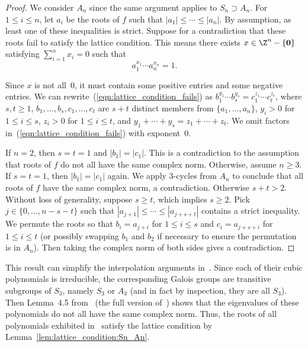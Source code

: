 \documentclass[11pt]{article}
\newenvironment{remark}{\medskip{\bfseries \noindent Remark:}}{\par\medskip}{\par\medskip}
\begin{document}
\begin{proof}
 We consider $A_n$ since the same argument applies to $S_n \supset A_n$.
 For $1 \le i \le n$,
 let $a_i$ be the roots of $f$ such that $|a_1| \le \dotsb \le |a_n|$.
 By assumption, as least one of these inequalities is strict.
 Suppose for a contradiction that these roots fail to satisfy the lattice condition.
 This means there exists $x \in \Z^n - \{\mathbf{0}\}$ satisfying $\sum_{i=1}^n x_i = 0$ such that
 \begin{equation} \label{eqn:lattice_condition_fails}
  a_1^{x_1} \dotsb a_n^{x_n} = 1.
 \end{equation}
 
 Since $x$ is not all~$0$,
 it must contain some positive entries and some negative entries.
 We can rewrite~(\ref{eqn:lattice_condition_fails}) as $b_1^{y_1} \dotsb b_s^{y_s} = c_1^{z_1} \dotsb c_t^{z_t}$,
 where $s, t \ge 1$, $b_1, \ldots, b_s, c_1, \ldots, c_t$ are $s+t$ distinct members from $\{a_1, \ldots, a_n\}$,
 $y_i > 0$ for $1 \le i \le s$, $z_i > 0$ for $1 \le i \le t$, and
 $y_1 + \dotsb + y_s = z_1 + \dotsb + z_t$.
 We omit factors in~(\ref{eqn:lattice_condition_fails}) with exponent~$0$.
 
 If $n=2$,
 then $s=t=1$ and $|b_1| = |c_1|$. 
 This is a contradiction to the assumption that roots of $f$ do not all have the same complex norm.
 Otherwise, assume $n \ge 3$.
 If $s = t = 1$,
 then $|b_1| = |c_1|$ again. 
 We apply 3-cycles from $A_n$ to conclude that all roots of $f$ have the same complex norm, a contradiction.
 Otherwise $s + t > 2$.
 Without loss of generality,
 suppose $s \ge t$,
 which implies $s \ge 2$.
 Pick $j \in \{0, \dotsc, n-s-t\}$ such that $|a_{j+1}| \le \dotsb \le |a_{j+s+t}|$ contains a strict inequality.
 We permute the roots so that $b_i = a_{j+i}$ for $1 \le i \le s$ and $c_i = a_{j+s+i}$ for $1 \le i \le t$
 (or possibly swapping $b_1$ and $b_2$ if necessary to ensure the permutation is in $A_n$).
 Then taking the complex norm of both sides gives a contradiction.
\end{proof}

\begin{remark}
 This result can simplify the interpolation arguments in~\cite{CLX12}.
 Since each of their cubic polynomials is irreducible,
 the corresponding Galois groups are transitive subgroups of $S_3$,
 namely $S_3$ or $A_3$ (and in fact  by inspection, they are all $S_3$).
 Then Lemma~4.5 from~\cite{KC10_arXiv} (the full version of~\cite{KC10}) shows that the eigenvalues of these polynomials do not all have the same complex norm.
 Thus,
 the roots of all polynomials exhibited in~\cite{CLX12} satisfy the lattice condition by Lemma~\ref{lem:lattice_condition:Sn_An}.
\end{remark}
\end{document}
